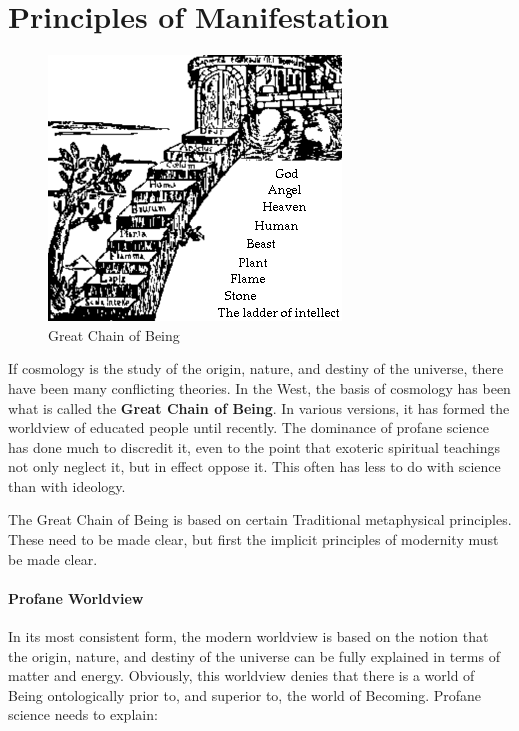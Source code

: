 \section{Principles of Manifestation}


\begin{figure}
\centering
\includegraphics[scale=.5]{a20141119PrinciplesofManifestation-img001.png} 
\caption{Great Chain of Being}
\end{figure}
 
If cosmology is the study of the origin, nature, and destiny of the universe, there have been many conflicting theories. In the West, the basis of cosmology has been what is called the \textbf{Great Chain of Being}. In various versions, it has formed the worldview of educated people until recently. The dominance of profane science has done much to discredit it, even to the point that exoteric spiritual teachings not only neglect it, but in effect oppose it. This often has less to do with science than with ideology.

The Great Chain of Being is based on certain Traditional metaphysical principles. These need to be made clear, but first the implicit principles of modernity must be made clear.

\paragraph{Profane Worldview}
In its most consistent form, the modern worldview is based on the notion that the origin, nature, and destiny of the universe can be fully explained in terms of matter and energy. Obviously, this worldview denies that there is a world of Being ontologically prior to, and superior to, the world of Becoming. Profane science needs to explain:


